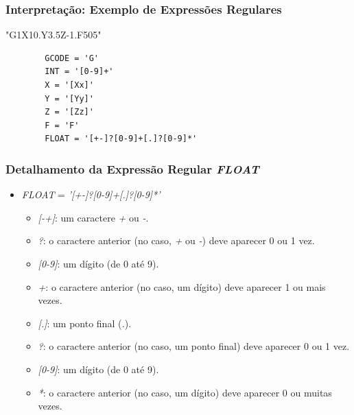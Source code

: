 \documentclass[aspectratio=169]{beamer}
\begin{document}
{\begin{frame}[fragile]
  \frametitle{Interpretação: Exemplo de Expressões Regulares}
  \begin{example}
      "G1X10.Y3.5Z-1.F505"
      \begin{lstlisting}
        GCODE = 'G'        
        INT = '[0-9]+'
        X = '[Xx]'
        Y = '[Yy]'
        Z = '[Zz]'
        F = 'F'
        FLOAT = '[+-]?[0-9]+[.]?[0-9]*'
      \end{lstlisting}
    \end{example}
  \end{frame}


  \begin{frame}
    \frametitle{Detalhamento da Expressão Regular \emph{FLOAT}}
    \begin{itemize}
      \item \emph{FLOAT} = \emph{'[+-]?[0-9]+[.]?[0-9]*'}
        \begin{itemize}
          \item \emph{[-+]}: um caractere \emph{+} ou \emph{-}.
          \item \emph{?}: o caractere anterior (no caso, \emph{+} ou \emph{-}) deve aparecer 0 ou 1 vez.
          \item \emph{[0-9]}: um dígito (de 0 até 9).
          \item \emph{+}: o caractere anterior (no caso, um dígito) deve aparecer 1 ou mais vezes.
          \item \emph{[.]}: um ponto final (\emph{.}).
          \item \emph{?}: o caractere anterior (no caso, um ponto final) deve aparecer 0 ou 1 vez.
          \item \emph{[0-9]}: um dígito (de 0 até 9).
          \item \emph{*}: o caractere anterior (no caso, um dígito) deve aparecer 0 ou muitas vezes.
      \end{itemize}
    \end{itemize}
\end{frame}


}
\end{document}
